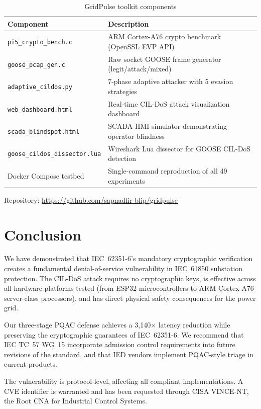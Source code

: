 \documentclass[11pt,a4paper]{article}
\begin{document}
\begin{table}[H]
\centering
\caption{GridPulse toolkit components}
\begin{tabularx}{\textwidth}{@{}lX@{}}
\toprule
\textbf{Component} & \textbf{Description} \\
\midrule
\texttt{pi5\_crypto\_bench.c} & ARM Cortex-A76 crypto benchmark (OpenSSL EVP API) \\
\texttt{goose\_pcap\_gen.c} & Raw socket GOOSE frame generator (legit/attack/mixed) \\
\texttt{adaptive\_cildos.py} & 7-phase adaptive attacker with 5 evasion strategies \\
\texttt{web\_dashboard.html} & Real-time CIL-DoS attack visualization dashboard \\
\texttt{scada\_blindspot.html} & SCADA HMI simulator demonstrating operator blindness \\
\texttt{goose\_cildos\_dissector.lua} & Wireshark Lua dissector for GOOSE CIL-DoS detection \\
Docker Compose testbed & Single-command reproduction of all 49 experiments \\
\bottomrule
\end{tabularx}
\end{table}

Repository: \url{https://github.com/sapnadfir-blip/gridpulse}

\section{Conclusion}

We have demonstrated that IEC~62351-6's mandatory cryptographic verification creates a fundamental denial-of-service vulnerability in IEC~61850 substation protection. The CIL-DoS attack requires no cryptographic keys, is effective across all hardware platforms tested (from ESP32 microcontrollers to ARM Cortex-A76 server-class processors), and has direct physical safety consequences for the power grid.

Our three-stage PQAC defense achieves a 3{,}140$\times$ latency reduction while preserving the cryptographic guarantees of IEC~62351-6. We recommend that IEC TC~57 WG~15 incorporate admission control requirements into future revisions of the standard, and that IED vendors implement PQAC-style triage in current products.

The vulnerability is protocol-level, affecting all compliant implementations. A CVE identifier is warranted and has been requested through CISA VINCE-NT, the Root CNA for Industrial Control Systems.
\end{document}
